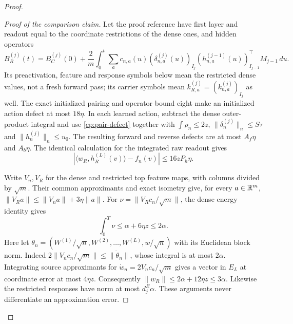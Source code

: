 \begin{proof}
\begin{proof}[Proof of the comparison claim]
Let the proof reference have first layer and readout equal to the
coordinate restrictions of the dense ones, and hidden operators
\[
 B_R^{(j)}(t)=B_C^{(j)}(0)+\frac2m\int_0^t\sum_a
 c_{n,a}(u)(\delta_{n,a}^{(j)}(u))_{I_j}
              (h_{n,a}^{(j-1)}(u))_{I_{j-1}}^\top M_{j-1}\,du.
\]
Its preactivation, feature and response symbols below mean the restricted
dense values, not a fresh forward pass; its carrier symbols
mean $k_{R,a}^{(j)}=(k_{n,a}^{(j)})_{I_j}$ as well.
The exact initialized
pairing and operator bound eight make an initialized action defect at
most $18\eta$. In each learned action, subtract the dense outer-product
integral and use \eqref{cp:pair-defect} together with
$\int\rho_n\le2z$, $\|\delta_n^{(j)}\|_n\le S\tau$ and
$\|h_n^{(j)}\|_n\le u_0$. The resulting forward and reverse defects
are at most $A_f\eta$ and $A_b\eta$. The identical calculation for
the integrated raw readout gives
\begin{equation}
 |\langle w_R,h_R^{(L)}(v)\rangle-f_n(v)|\le16zP_h\eta.
 \label{cp:readout-observation}
\end{equation}

Write $V_n,V_R$ for the dense and restricted top feature maps, with
columns divided by $\sqrt m$. Their common approximants and exact
isometry give, for every $a\in\mathbb R^m$,
$\|V_Ra\|\le\|V_na\|+3\eta\|a\|$.
For $\nu=\|V_Rc_n/\sqrt m\|$, the dense energy identity gives
\begin{equation}
 \int_0^T\nu\le\alpha+6\eta z\le2\alpha.
 \label{cp:source-energy}
\end{equation}
Here let $\theta_n=(W^{(1)}/\sqrt n,W^{(2)},\ldots,W^{(L)},w/\sqrt n)$
with its Euclidean block norm. Indeed
$2\|V_nc_n/\sqrt m\|\le\|\dot\theta_n\|$,
whose integral is at most $2\alpha$.
Integrating source approximants for $\dot w_n=2V_nc_n/\sqrt m$
gives a vector in $E_L$ at coordinate error at most $4\eta z$.
Consequently $\|w_R\|\le2\alpha+12\eta z\le3\alpha$.
Likewise the restricted responses have norm at most $d_j^E\alpha$.
These arguments never differentiate an approximation error.


\end{proof}
\end{proof}
